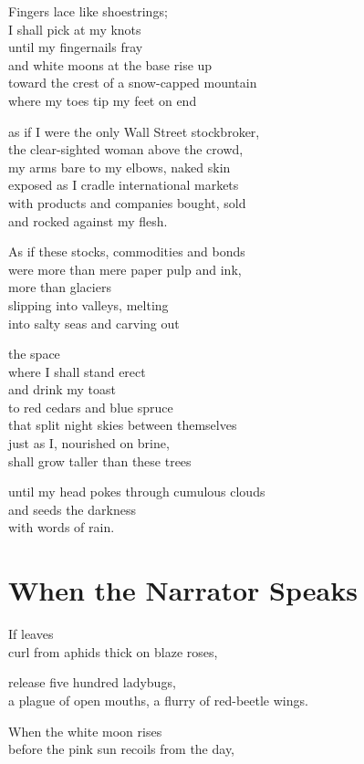 \documentclass[twoside,10pt]{book}
\begin{document}
Fingers lace like shoestrings;\\
I shall pick at my knots\\
until my fingernails fray\\
and white moons at the base rise up\\
toward the crest of a snow-capped mountain\\
where my toes tip my feet on end

as if I were the only Wall Street stockbroker,\\
the clear-sighted woman above the crowd,\\
my arms bare to my elbows, naked skin\\
exposed as I cradle international markets\\
with products and companies bought, sold\\
and rocked against my flesh.

As if these stocks, commodities and bonds\\
were more than mere paper pulp and ink,\\
more than glaciers\\
slipping into valleys, melting\\
into salty seas and carving out

the space\\
where I shall stand erect\\
and drink my toast\\
to red cedars and blue spruce\\
that split night skies between themselves\\
just as I, nourished on brine,\\
shall grow taller than these trees

until my head pokes through cumulous clouds\\
and seeds the darkness\\
with words of rain.


\clearpage
\section{When the Narrator Speaks}

If leaves\\
curl from aphids thick on blaze roses,

release five hundred ladybugs,\\
a plague of open mouths, a flurry of red-beetle wings.

When the white moon rises\\
before the pink sun recoils from the day,
\end{document}
